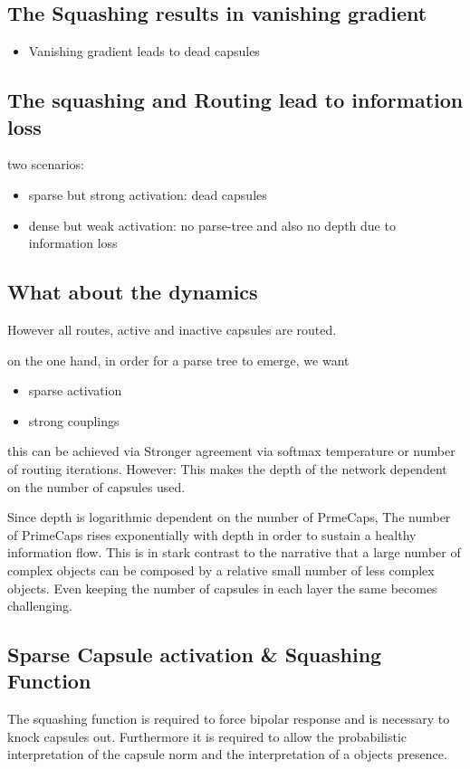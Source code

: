 \documentclass{article}
\begin{document}
\subsection{The Squashing results in vanishing gradient}
\begin{itemize}
	\item Vanishing gradient leads to dead capsules
\end{itemize}
\subsection{The squashing and Routing lead to information loss}
two scenarios:
\begin{itemize}
	\item sparse but strong activation: dead capsules
	\item dense but weak activation: no parse-tree and also no depth due to information loss
\end{itemize}
\subsection{What about the dynamics}


However all routes, active and inactive capsules are routed.

on the one hand, in order for a parse tree to emerge, we want
\begin{itemize}
	\item sparse activation
	\item strong couplings
\end{itemize}
this can be achieved via Stronger agreement via softmax temperature or number of routing iterations.
However: This makes the depth of the network dependent on the number of capsules used.


Since depth is logarithmic dependent on the number of PrmeCaps, The number of PrimeCaps rises exponentially with depth in order to sustain a healthy information flow. This is in stark contrast to the narrative that a large number of complex objects can be composed by a relative small number of less complex objects.
Even keeping the number of capsules in each layer the same becomes challenging.

\subsection{Sparse Capsule activation \& Squashing Function}
The squashing function is required to force bipolar response and is necessary to knock capsules out. Furthermore it is required to allow the probabilistic interpretation of the capsule norm and the interpretation of a objects presence.
\end{document}
